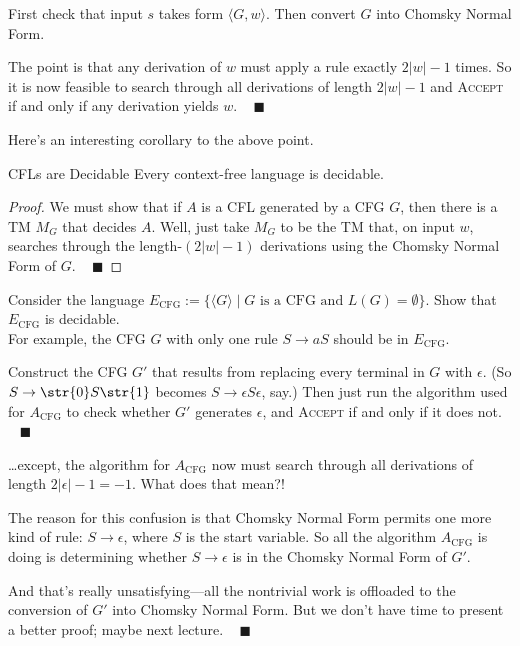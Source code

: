 \begin{solution}
    First check that input $s$ takes form $\langle G, w \rangle$.
    Then convert $G$ into Chomsky Normal Form.

    The point is that any derivation of $w$ must apply a rule
    exactly $2|w| - 1$ times.  So it is now feasible
    to search through all derivations of length $2|w| - 1$
    and \textsc{Accept} if and only if any derivation yields $w$.
    ~ $\blacksquare$
\end{solution}

Here's an interesting corollary to the above point.

\begin{theorem}{CFLs are Decidable}
    Every context-free language is decidable.
\end{theorem}

\begin{proof}
    We must show that if $A$ is a CFL
    generated by a CFG $G$, then
    there is a TM $M_G$ that decides $A$.
    Well, just take $M_G$ to be the TM that,
    on input $w$, searches through the
    length-$(2|w| - 1)$ derivations using the
    Chomsky Normal Form of $G$.
    ~ $\blacksquare$
\end{proof}

\begin{problem}
    Consider the language
    $E_{\mathrm{CFG}} := \{\langle G \rangle \mid
    G \text{ is a CFG and } L(G) = \emptyset\}$.
    Show that $E_{\mathrm{CFG}}$ is decidable. \\
    For example, the CFG $G$ with only one rule
    $S \rightarrow aS$ should be in $E_{\mathrm{CFG}}$.
\end{problem}

\begin{solution}
    Construct the CFG $G'$ that results from
    replacing every terminal in $G$ with $\epsilon$.
    (So $S \rightarrow \str{0}S\str{1}$
    becomes $S \rightarrow \epsilon S \epsilon$, say.)
    Then just run the algorithm used for $A_{\mathrm{CFG}}$
    to check whether $G'$ generates $\epsilon$,
    and \textsc{Accept} if and only if it does not. ~ $\blacksquare$

    \dots except, the algorithm for $A_{\mathrm{CFG}}$
    now must search through
    all derivations of length $2|\epsilon| - 1 = -1$.
    What does that mean?!

    The reason for this confusion is that
    Chomsky Normal Form permits one more kind of rule:
    $S \to \epsilon$, where $S$ is the start variable.
    So all the algorithm $A_{\mathrm{CFG}}$ is doing
    is determining whether $S \rightarrow \epsilon$
    is in the Chomsky Normal Form of $G'$.

    And that's really unsatisfying---all the nontrivial work
    is offloaded to the conversion of $G'$ into Chomsky Normal Form.
    But we don't have time to present a better proof; maybe next lecture.
    ~ $\blacksquare$
\end{solution}

